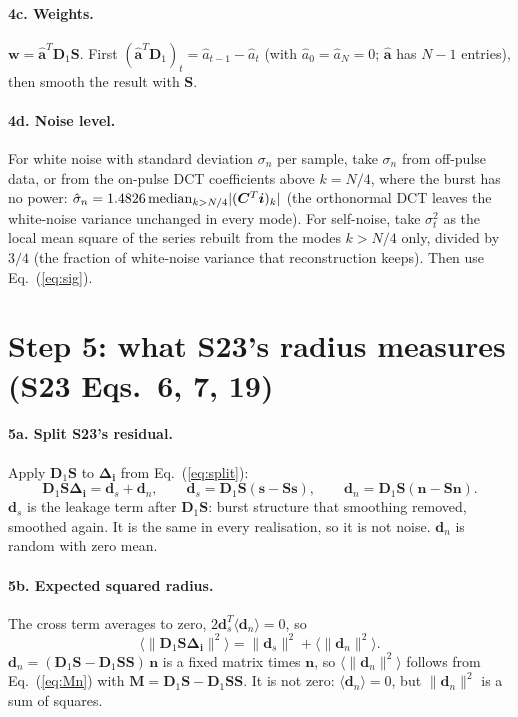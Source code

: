 \documentclass[11pt]{article}
\newcommand{\vb}[1]{\boldsymbol{#1}}
\newcommand{\Dn}{\vb D_1}
\newcommand{\Sm}{\vb S}
\newcommand{\Di}{\vb\Delta_{\vb i}}
\newcommand{\ah}{\hat{\vb a}}
\newcommand{\nrm}[1]{\lVert #1\rVert}
\begin{document}
\paragraph{4c. Weights.}
$\vb w=\ah^{T}\Dn\Sm$. First $(\ah^{T}\Dn)_t=\hat a_{t-1}-\hat a_t$ (with $\hat a_0=\hat a_N=0$; $\ah$ has $N-1$
entries), then smooth the result with $\Sm$.

\paragraph{4d. Noise level.}
For white noise with standard deviation $\sigma_n$ per sample, take $\sigma_n$ from off-pulse data, or from the on-pulse DCT coefficients above $k=N/4$,
where the burst has no power:
$\hat\sigma_n=1.4826\,{\rm median}_{k>N/4}|(\vb C^{T}\vb i)_k|$ (the orthonormal DCT leaves the white-noise
variance unchanged in every mode). For self-noise, take $\sigma_t^{2}$ as the local mean square of the series
rebuilt from the modes $k>N/4$ only, divided by $3/4$ (the fraction of white-noise variance that
reconstruction keeps). Then use Eq.~(\ref{eq:sig}).

\section*{Step 5: what S23's radius measures (S23 Eqs.~6, 7, 19)}

\paragraph{5a. Split S23's residual.}
Apply $\Dn\Sm$ to $\Di$ from Eq.~(\ref{eq:split}):
\begin{equation}
\Dn\Sm\Di=\vb d_s+\vb d_n,\qquad \vb d_s=\Dn\Sm(\vb s-\Sm\vb s),\qquad \vb d_n=\Dn\Sm(\vb n-\Sm\vb n).
\end{equation}
$\vb d_s$ is the leakage term after $\Dn\Sm$: burst structure that smoothing removed, smoothed again. It is the same in
every realisation, so it is not noise. $\vb d_n$ is random with zero mean.

\paragraph{5b. Expected squared radius.}
The cross term averages to zero, $2\vb d_s^{T}\langle\vb d_n\rangle=0$, so
\begin{equation}
\langle\nrm{\Dn\Sm\Di}^{2}\rangle=\nrm{\vb d_s}^{2}+\langle\nrm{\vb d_n}^{2}\rangle .
\end{equation}
$\vb d_n=(\Dn\Sm-\Dn\Sm\Sm)\,\vb n$ is a fixed matrix times $\vb n$, so $\langle\nrm{\vb d_n}^{2}\rangle$ follows from
Eq.~(\ref{eq:Mn}) with $\vb M=\Dn\Sm-\Dn\Sm\Sm$. It is not zero:
$\langle\vb d_n\rangle=0$, but $\nrm{\vb d_n}^{2}$ is a sum of squares.
\end{document}
